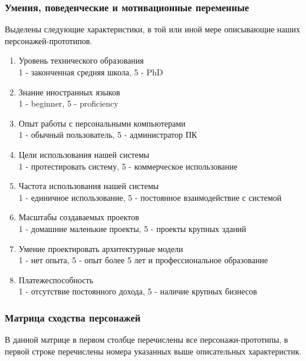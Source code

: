 \documentclass[a4paper,14pt]{extreport} %
\begin{document}
\subsubsection{Умения, поведенческие и мотивационные переменные}

Выделены следующие характеристики, в той или иной мере описывающие наших персонажей-прототипов.
\begin{enumerate}
\item Уровень технического образования \\
1 - законченная средняя школа, 5 - PhD
\item Знание иностранных языков \\
1 - beginner, 5 - proficiency
\item Опыт работы с персональными компьютерами \\
1 - обычный пользователь, 5 - администратор ПК
\item Цели использования нашей системы \\
1 - протестировать систему, 5 - коммерческое использование
\item Частота использования нашей системы \\
1 - единичное использование, 5 - постоянное взаимодействие с системой
\item Масштабы создаваемых проектов \\
1 - домашние маленькие проекты, 5 - проекты крупных зданий
\item Умение проектировать архитектурные модели \\
1 - нет опыта, 5 - опыт более 5 лет и профессиональное образование
\item Платежеспособность \\
1 - отсутствие постоянного дохода, 5 - наличие крупных бизнесов
\end{enumerate}

\newpage
\subsubsection{Матрица сходства персонажей}

В данной матрице в первом столбце перечислены все персонажи-прототипы, в первой строке перечислены номера  указанных выше описательных характеристик.
\end{document}
